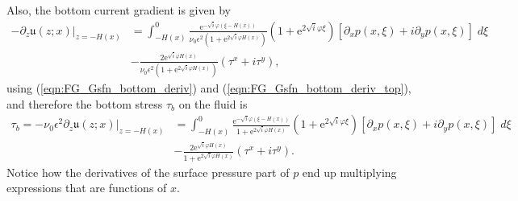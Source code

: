 \documentclass[10pt]{amsart}
\begin{document}
Also, the bottom current gradient is given by
\begin{align}
-\partial_z \left. \mathfrak{u} (z;x) \right|_{z = -H(x)} & =  \int_{-H(x)}^{0} 
 \frac{ \mathrm{e}^{-\sqrt{i} \varphi (\xi - H(x))  } }{ \nu_0 \epsilon^2 \left(1 + \mathrm{e}^{2 \sqrt{i} \varphi H \left(x \right)} \right)}
\left( 1 + \mathrm{e}^{2 \sqrt{i} \varphi \xi}\right) 
 \left[ \partial_x p( x, \xi) + i \partial_y p( x, \xi) \right] \; d \xi \nonumber \\
& - \frac{ 2 \mathrm{e}^{\sqrt{i} \varphi H(x)  } }{ \nu_0 \epsilon^2 \left(1 + \mathrm{e}^{2 \sqrt{i} \varphi H \left(x \right)} \right)}
\left( \tau^x + i \tau^y \right) ,
\end{align}
using (\ref{eqn:FG_Gsfn_bottom_deriv}) and (\ref{eqn:FG_Gsfn_bottom_deriv_top}), and therefore the bottom stress $\tau_b$ on the fluid is
\begin{align}
\tau_b = - \nu_0 \epsilon^2 \partial_z \left. \mathfrak{u} (z;x) \right|_{z = -H(x)} & = \int_{-H(x)}^{0} 
\frac{ \mathrm{e}^{-\sqrt{i} \varphi (\xi - H(x))  } }{ 1 + \mathrm{e}^{2 \sqrt{i} \varphi H \left(x \right)} }
\left( 1 + \mathrm{e}^{2 \sqrt{i} \varphi \xi}\right) 
 \left[ \partial_x p( x, \xi) + i \partial_y p( x, \xi) \right] \; d \xi \nonumber \\
&-\frac{ 2 \mathrm{e}^{\sqrt{i} \varphi H(x)  } }{ 1 + \mathrm{e}^{2 \sqrt{i} \varphi H \left(x \right)} }
 \left( \tau^x + i \tau^y \right) .
 \label{eqn:bottom_stress_expression}
 \end{align}
Notice how the derivatives of the surface pressure part of $p$ end up multiplying expressions that are functions of $x$.
\end{document}
